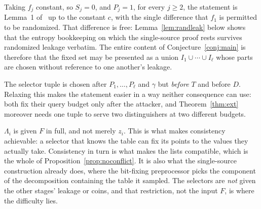 \documentclass{conjura-conjecture}
\begin{document}
\begin{remark}\label{rem:reduces}
Taking $f_j$ constant, so $S_j = 0$, and $P_j = 1$, for every $j \ge 2$,
the statement is Lemma~1 of~\cite{CDGS} up to the constant $c$, with the
single difference that $f_1$ is permitted to be randomized. That
difference is free: Lemma~\ref{lem:randleak} below shows that the entropy
bookkeeping on which the single-source proof rests survives randomized
leakage verbatim. The entire content of Conjecture~\ref{conj:main} is
therefore that the fixed set may be presented as a union
$I_1 \cup \cdots \cup I_\ell$ whose parts are chosen without reference to
one another's leakage.
\end{remark}

\begin{remark}\label{rem:order}
The selector tuple is chosen after $P_1,\dots,P_\ell$ and $\gamma$ but
\emph{before} $T$ and before $D$. Relaxing this makes the statement easier
in a way neither consequence can use: both fix their query budget only
after the attacker, and Theorem~\ref{thm:ext} moreover needs one tuple to
serve two distinguishers at two different budgets.
\end{remark}

\begin{remark}\label{rem:allofF}
$\Lambda_i$ is given $F$ in full, and not merely $z_i$. This is what makes
consistency achievable: a selector that knows the table can fix its points
to the values they actually take. Consistency in turn is what makes the
lists compatible, which is the whole of
Proposition~\ref{prop:noconflict}. It is also what the single-source
construction already does, where the bit-fixing preprocessor picks the
component of the decomposition containing the table it sampled. The
selectors are \emph{not} given the other stages' leakage or coins, and
that restriction, not the input $F$, is where the difficulty lies.
\end{remark}
\end{document}
